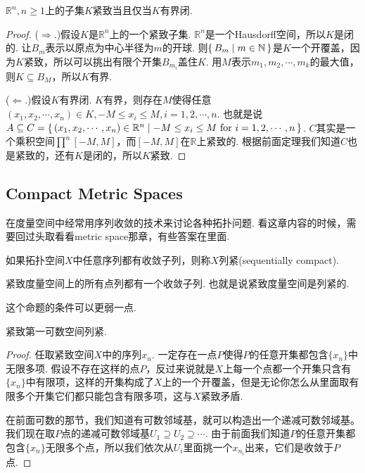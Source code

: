 \begin{theorem}
$\mathbb{R}^{n},n \geq 1$上的子集$K$紧致当且仅当$K$有界闭.
\end{theorem}

\begin{proof}
($\Rightarrow.$)假设$K$是$\mathbb{R}^{n}$上的一个紧致子集. $\mathbb{R}^{n}$是一个Hausdorff空间，所以$K$是闭的. 让$B_m$表示以原点为中心半径为$m$的开球. 则$\{\,B_m\mid m \in \mathbb{N}\,\}$是$K$一个开覆盖，因为$K$紧致，所以可以挑出有限个开集$B_{m_i}$盖住$K$. 用$M$表示$m_1,m_2,\cdots,m_k$的最大值，则$K \subseteq B_M$，所以$K$有界.

($\Leftarrow.$)假设$K$有界闭. $K$有界，则存在$M$使得任意$(x_1,x_2,\cdots,x_n) \in K, -M \leq x_i \leq M, i=1,2,\cdots,n$. 也就是说$A \subseteq C=\Set{(x_1,x_2,\cdots,x_n) \in \mathbb{R}^{n}}{-M \leq x_i \leq M\ \text{for}\ i=1,2,\cdots,n}$. $C$其实是一个乘积空间$\prod\limits^{n} [-M,M]$，而$[-M,M]$在$\mathbb{R}$上紧致的. 根据前面定理我们知道$C$也是紧致的，还有$K$是闭的，所以$K$紧致.
\end{proof}


\newpage
\subsection{Compact Metric Spaces}

在度量空间中经常用序列收敛的技术来讨论各种拓扑问题. 看这章内容的时候，需要回过头取看看metric space那章，有些答案在里面.

\begin{definition}
如果拓扑空间$X$中任意序列都有收敛子列，则称$X$列紧(sequentially compact).
\end{definition}


\begin{proposition}
紧致度量空间上的所有点列都有一个收敛子列. 也就是说紧致度量空间是列紧的.
\end{proposition}

这个命题的条件可以更弱一点.

\begin{proposition}
紧致第一可数空间列紧.
\end{proposition}

\begin{proof}
任取紧致空间$X$中的序列${x_n}$. 一定存在一点$P$使得$P$的任意开集都包含$\{x_n\}$中无限多项. 假设不存在这样的点$P$，反过来说就是$X$上每一个点都一个开集只含有$\{x_n\}$中有限项，这样的开集构成了$X$上的一个开覆盖，但是无论你怎么从里面取有限多个开集它们都只能包含有限多项，这与$X$紧致矛盾.

在前面可数的那节，我们知道有可数邻域基，就可以构造出一个递减可数邻域基。我们现在取$P$点的递减可数邻域基$U_1 \supseteq U_2 \supseteq \cdots$. 由于前面我们知道$P$的任意开集都包含$\{x_n\}$无限多个点，所以我们依次从$U_i$里面挑一个$x_{n_i}$出来，它们是收敛于$P$点.
\end{proof}


